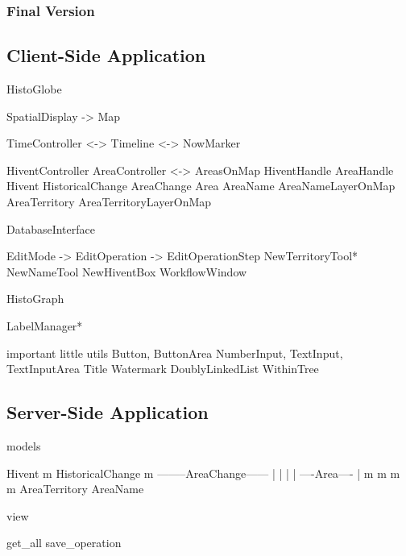 
\subsubsection{Final Version} %
\label{ssub:final_version}




\subsection{Client-Side Application} %
\label{sub:client_side_application}



HistoGlobe

SpatialDisplay -> Map

TimeController  <-> Timeline
                <-> NowMarker

HiventController                AreaController <->  AreasOnMap
HiventHandle                    AreaHandle
Hivent
HistoricalChange    AreaChange  Area
                                AreaName            AreaNameLayerOnMap
                                AreaTerritory       AreaTerritoryLayerOnMap

DatabaseInterface

EditMode -> EditOperation -> EditOperationStep
NewTerritoryTool* NewNameTool NewHiventBox
WorkflowWindow

HistoGraph

LabelManager*

important little utils
  Button, ButtonArea
  NumberInput, TextInput, TextInputArea
  Title
  Watermark
  DoublyLinkedList
  WithinTree







\subsection{Server-Side Application} %
\label{sub:server_side_application}

models

           Hivent
             m
       HistoricalChange
             m
  --------AreaChange------
  |          |           |
  |     ----Area----     |
  m     m          m     m
AreaTerritory      AreaName


view

get\_all
save\_operation








